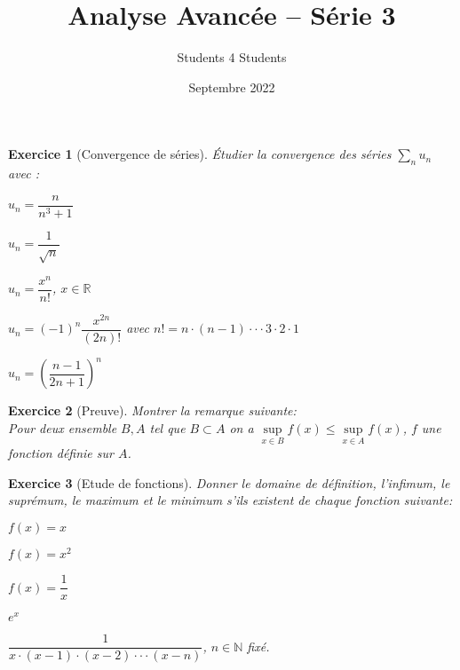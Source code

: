 \documentclass{article}
\title{\textbf{Analyse Avancée -- Série 3}}
\author{Students 4 Students}
\date{Septembre 2022}
\newcommand{\Nn}{{\mathbb{N}}}
\newcommand{\Rr}{{\mathbb{R}}}
\theoremstyle{exercice}
\newtheorem{exercice}{Exercice}
\begin{document}
\pagestyle{fancy}

\maketitle


\begin{exercice}[Convergence de séries]
    
Étudier la convergence des séries $\sum_n u_n $ avec : 

\begin{enumerate}
    \begin{multicols}{2}
    \item $u_n= \dfrac{n}{n^3+1}$
    \item $u_n=\dfrac{1}{\sqrt{n}}$
    \item $u_n=\dfrac{x^n}{n!}$, $x\in \Rr$
    \item $u_n=(-1)^n \dfrac{x^{2n}}{(2n)!}$ avec $n!=n\cdot (n-1)\cdot \cdot \cdot 3\cdot 2\cdot 1$
    \item $u_n=\left (\dfrac{n-1}{2n+1}\right )^n$
    \end{multicols}
\end{enumerate}

\end{exercice}

\begin{exercice}[Preuve]
    Montrer la remarque suivante:\\

Pour deux ensemble $B,A$ tel que $B\subset A $ on a $\underset{x\in B}{\sup}f(x)\leq \underset{x\in A}{\sup}f(x)$, $f$ une fonction définie sur $A$.
\end{exercice}


\begin{exercice}[Etude de fonctions]
    Donner le domaine de définition, l'infimum, le suprémum, le maximum et le minimum s'ils existent de chaque fonction suivante:

\begin{enumerate}
    \begin{multicols}{2}
        \item $f(x)=x$
        \item $f(x)=x^2$
        \item $f(x)=\dfrac{1}{x}$
        \item $e^x$
        \item $\dfrac{1}{x\cdot(x-1)\cdot(x-2)\cdot\cdot\cdot (x-n)}$, $n\in \Nn$ fixé. 
    \end{multicols} 
\end{enumerate}
\end{exercice}
\end{document}
